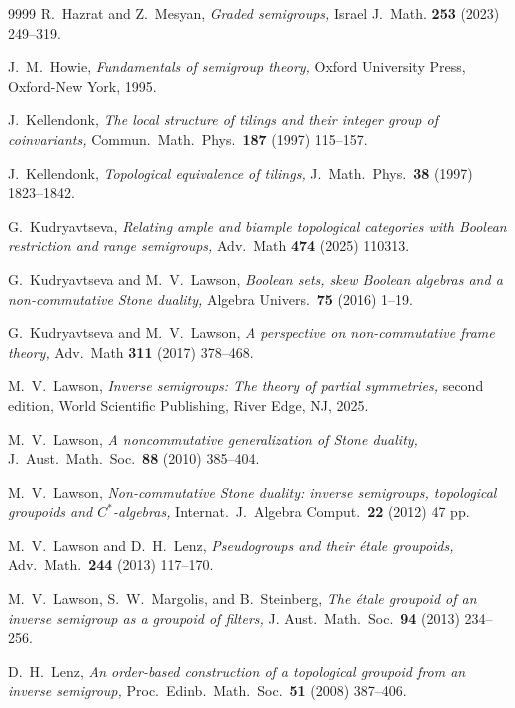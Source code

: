 \documentclass[a4paper,reqno,12pt]{amsart}
\numberwithin{equation}{section}
\theoremstyle{plain}
\theoremstyle{definition}
\begin{document}
\begin{thebibliography}{9999}
 R.\ Hazrat and Z.\ Mesyan, \textit{Graded semigroups,} Israel J.\ Math. \textbf{253} (2023) 249--319.

 J.\ M.\ Howie, \textit{Fundamentals of semigroup theory,} Oxford University Press, Oxford-New York, 1995.

 J.\ Kellendonk, \textit{The local structure of tilings and their integer group of coinvariants,} Commun.\ Math.\ Phys.\ \textbf{187} (1997) 115--157.

 J.\ Kellendonk, \textit{Topological equivalence of tilings,} J.\ Math.\ Phys.\ \textbf{38} (1997) 1823--1842.

 G.\ Kudryavtseva, \textit{Relating ample and biample topological categories with Boolean restriction and range semigroups,} Adv.\ Math \textbf{474} (2025) 110313.

 G.\ Kudryavtseva and M.\ V.\ Lawson, \textit{Boolean sets, skew Boolean algebras and a non-commutative Stone duality,} Algebra Univers.\ \textbf{75} (2016) 1--19.

 G.\ Kudryavtseva and M.\ V.\ Lawson, \textit{A perspective on non-commutative frame theory,} Adv.\ Math \textbf{311} (2017) 378--468.

 M.\ V.\ Lawson, \textit{Inverse semigroups: The theory of partial symmetries,} second edition, World Scientific Publishing, River Edge, NJ, 2025.

 M.\ V.\ Lawson, \textit{A noncommutative generalization of Stone duality,} J.\ Aust.\ Math.\ Soc.\ \textbf{88} (2010) 385--404.

 M.\ V.\ Lawson, \textit{Non-commutative Stone duality: inverse semigroups, topological groupoids and $C^*$-algebras,} Internat.\ J.\ Algebra Comput.\ \textbf{22} (2012) 47 pp.   

 M.\ V.\ Lawson and D.\ H.\ Lenz, \textit{Pseudogroups and their étale groupoids,} Adv.\ Math.\ \textbf{244} (2013) 117--170.

 M.\ V.\ Lawson, S.\ W.\ Margolis, and B.\ Steinberg, \textit{The étale groupoid of an inverse semigroup as a groupoid of filters,} J. Aust.\ Math.\ Soc.\ \textbf{94} (2013) 234--256.

 D.\ H.\ Lenz, \textit{An order-based construction of a topological groupoid from an inverse semigroup,} Proc.\ Edinb.\ Math.\ Soc.\ \textbf{51} (2008) 387--406.


\end{thebibliography}
\end{document}
